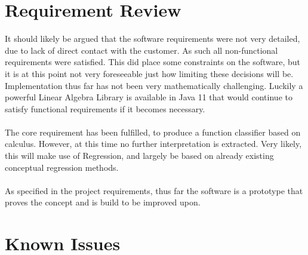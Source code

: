 \documentclass[main.tex]{subfiles}
\begin{document}
    
  \section{Requirement Review}
    
    It should likely be argued that the software requirements were not very detailed, due to lack of direct contact with the customer. As such all non-functional requirements were satisfied. This did place some constraints on the software, but it is at this point not very foreseeable just how limiting these decisions will be. Implementation thus far has not been very mathematically challenging. Luckily a powerful Linear Algebra Library is available in Java 11 \cite{jBlas} that would continue to satisfy functional requirements if it becomes necessary.
    \\\\
    The core requirement has been fulfilled, to produce a function classifier based on calculus. However, at this time no further interpretation is extracted. Very likely, this will make use of Regression, and largely be based on already existing conceptual regression methods.
    \\\\
    As specified in the project requirements, thus far the software is a prototype that proves the concept and is build to be improved upon.
    
  \section{Known Issues}
    
\end{document}
